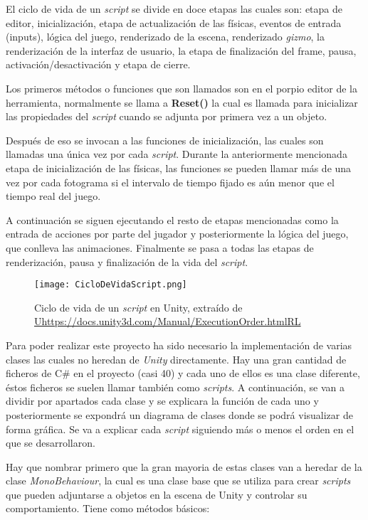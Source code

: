 El ciclo de vida de un \textit{script} se divide en doce etapas las cuales son: etapa de editor, inicialización, etapa de actualización de las físicas, eventos de entrada (inputs), lógica del juego, renderizado de la escena, renderizado \textit{gizmo}, la renderización de la interfaz de usuario, la etapa de finalización del frame, pausa, activación/desactivación y etapa de cierre. 

Los primeros métodos o funciones que son llamados son en el porpio editor de la herramienta, normalmente se llama a \textbf{Reset()} la cual es llamada para inicializar las propiedades del \textit{script} cuando se adjunta por primera vez a un objeto.

Después de eso se invocan a las funciones de inicialización, las cuales son llamadas una única vez por cada \textit{script}. Durante la anteriormente mencionada etapa de inicialización de las físicas, las funciones se pueden llamar más de una vez por cada fotograma si el intervalo de tiempo fijado es aún menor que el tiempo real del juego. 

A continuación se siguen ejecutando el resto de etapas mencionadas como la entrada de acciones por parte del jugador y posteriormente la lógica del juego, que conlleva las animaciones. Finalmente se pasa a todas las etapas de renderización, pausa y finalización de la vida del \textit{script}.

\begin{figure}[H]
    \centering
    \texttt{[image: CicloDeVidaScript.png]}
    \caption{Ciclo de vida de un \textit{script} en Unity, extraído de \url{Uhttps://docs.unity3d.com/Manual/ExecutionOrder.htmlRL}}
\end{figure}


Para poder realizar este proyecto ha sido necesario la implementación de varias clases las cuales no heredan de \textit{Unity} directamente. Hay una gran cantidad de ficheros de C\# en el proyecto (casi 40) y cada uno de ellos es una clase diferente, éstos ficheros se suelen llamar también como \textit{scripts}. A continuación, se van a dividir por apartados cada clase y se explicara la función de cada uno y posteriormente se expondrá un diagrama de clases donde se podrá visualizar de forma gráfica. Se va a explicar cada \textit{script} siguiendo más o menos el orden en el que se desarrollaron.

Hay que nombrar primero que la gran mayoria de estas clases van a heredar de la clase \textit{MonoBehaviour}, la cual es una clase base que se utiliza para crear \textit{scripts} que pueden adjuntarse a objetos en la escena de Unity y controlar su comportamiento. Tiene como métodos básicos:

